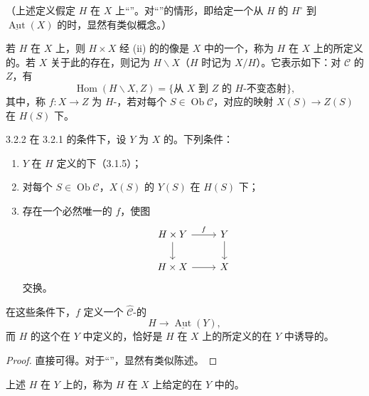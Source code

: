 （上述定义假定 $H$ 在 $X$ 上“”。对“”的情形，即给定一个从 $H$ 的 $H^\circ$ 到 $\underline{\operatorname{Aut}}(X)$ 的时，显然有类似概念。）

若 $H$ 在 $X$ 上，则 $H\times X$ 经 (ii) 的的像是 $X$ 中的一个，称为 $H$ 在 $X$ 上的所定义的。若 $X$ 关于此的存在，则记为 $H\backslash X$（$H$ 时记为 $X/H$）。它表示如下：对 $\mathcal C$ 的 $Z$，有
\[
 \operatorname{Hom}(H\backslash X,Z)=\{\text{从 }X\text{ 到 }Z\text{ 的 }H\text{-不变态射}\},
\]
其中，称 $f:X\to Z$ 为 $H$-，若对每个 $S\in\operatorname{Ob}\mathcal C$，对应的映射 $X(S)\to Z(S)$ 在 $H(S)$ 下。
\begin{SGAresult}{}{3.2.2}
在 3.2.1 的条件下，设 $Y$ 为 $X$ 的。下列条件：
\begin{enumerate}
\item[(i)] $Y$ 在 $H$ 定义的下（3.1.5）；
\item[(ii)] 对每个 $S\in\operatorname{Ob}\mathcal C$，$X(S)$ 的 $Y(S)$ 在 $H(S)$ 下；
\item[(iii)] 存在一个必然唯一的 $f$，使图
\[
\begin{tikzcd}H\times Y\arrow[r,"f"]\arrow[d]&Y\arrow[d]\\H\times X\arrow[r]&X\end{tikzcd}
\]
交换。
\end{enumerate}
在这些条件下，$f$ 定义一个 $\widehat{\mathcal C}$-的
\[
 H\longrightarrow\underline{\operatorname{Aut}}(Y),
\]
而 $H$ 的这个在 $Y$ 中定义的，恰好是 $H$ 在 $X$ 上的所定义的在 $Y$ 中诱导的。
\end{SGAresult}
\begin{proof}直接可得。对于“”，显然有类似陈述。\end{proof}
上述 $H$ 在 $Y$ 上的，称为 $H$ 在 $X$ 上给定的在 $Y$ 中的。

